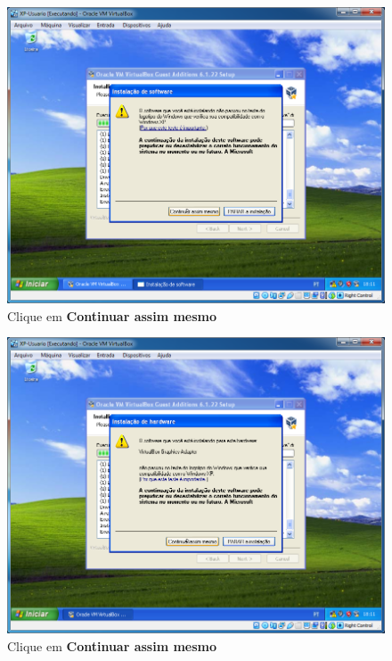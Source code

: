 \documentclass[10pt]{article}
\begin{document}
\begin{figure}[H]
    \centering
    \caption{Clique em \textbf{Continuar assim mesmo}}
    \label{fig:3119}
    \includegraphics[width=\linewidth]{images/ativacao_das_maquinas_virtuais/configuracao_inicial_das_maquinas_virtuais/019.png}
\end{figure}
\begin{figure}[H]
    \centering
    \caption{Clique em \textbf{Continuar assim mesmo}}
    \label{fig:3120}
    \includegraphics[width=\linewidth]{images/ativacao_das_maquinas_virtuais/configuracao_inicial_das_maquinas_virtuais/020.png}
\end{figure}
\end{document}
